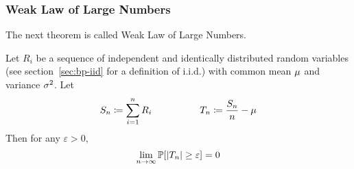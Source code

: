 \subsubsection{Weak Law of Large Numbers}
\label{sec:bp-weak-law}
%
The next theorem is called Weak Law of Large Numbers.
\begin{theorem}\label{thm:weak-lln}
  Let $R_i$ be a sequence of independent and identically distributed random variables
  (see section~\ref{sec:bp-iid} for a definition of i.i.d.)
  with common mean $\mu$ and variance $\sigma^2$. Let
  \[
      S_n \coloneqq \sum_{i=1}^n R_i \hspace{50pt}
      T_n \coloneqq \frac{S_n}{n} - \mu
  \]
  Then for any $\varepsilon > 0$,
  \[ \lim_{n\to\infty} \mathbb P[\left\lvert{T_n}\right\rvert \geq \varepsilon] = 0 \]
\end{theorem}

